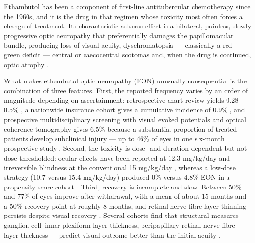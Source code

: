 \documentclass[utf8]{FrontiersinVancouver}
\begin{document}
Ethambutol has been a component of first-line antitubercular chemotherapy since the 1960s, and it is the drug in that regimen whose toxicity most often forces a change of treatment. Its characteristic adverse effect is a bilateral, painless, slowly progressive optic neuropathy that preferentially damages the papillomacular bundle, producing loss of visual acuity, dyschromatopsia --- classically a red--green deficit --- central or caecocentral scotomas and, when the drug is continued, optic atrophy \citep{pd2017,s2022,hr2024}.

What makes ethambutol optic neuropathy (EON) unusually consequential is the combination of three features. First, the reported frequency varies by an order of magnitude depending on ascertainment: retrospective chart review yields 0.28--0.5\% \citep{p2025,p2023}, a nationwide insurance cohort gives a cumulative incidence of 0.9\% \citep{s2025}, and prospective multidisciplinary screening with visual evoked potentials and optical coherence tomography gives 6.5\% \citep{ss2025} because a substantial proportion of treated patients develop subclinical injury --- up to 46\% of eyes in one six-month prospective study \citep{s2021}. Second, the toxicity is dose- and duration-dependent but not dose-thresholded: ocular effects have been reported at 12.3 mg/kg/day and irreversible blindness at the conventional 15 mg/kg/day \citep{sy1997,vk1986}, whereas a low-dose strategy (10.7 versus 15.4 mg/kg/day) produced 0\% versus 4.8\% EON in a propensity-score cohort \citep{y2026}. Third, recovery is incomplete and slow. Between 50\% and 77\% of eyes improve after withdrawal, with a mean of about 15 months and a 50\% recovery point at roughly 8 months, and retinal nerve fibre layer thinning persists despite visual recovery \citep{s2022,hr2024,g2026}. Several cohorts find that structural measures --- ganglion cell--inner plexiform layer thickness, peripapillary retinal nerve fibre layer thickness --- predict visual outcome better than the initial acuity \citep{jy2018,mc2024}.
\end{document}
